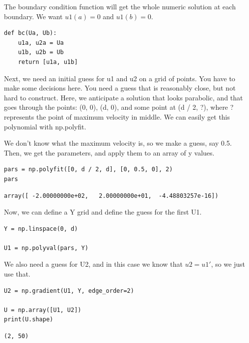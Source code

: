 \documentclass[11pt]{article}
\begin{document}
The boundary condition function will get the whole numeric solution at each boundary. We want \(u1(a) = 0\) and \(u1(b)=0\).

\begin{verbatim}
def bc(Ua, Ub):
    u1a, u2a = Ua
    u1b, u2b = Ub
    return [u1a, u1b]
\end{verbatim}

Next, we need an initial guess for u1 and u2 on a grid of points. You have to make some decisions here. You need a guess that is reasonably close, but not hard to construct. Here, we anticipate a solution that looks parabolic, and that goes through the points: (0, 0), (d, 0), and some point at (d / 2, ?), where ? represents the point of maximum velocity in middle. We can easily get this polynomial with np.polyfit.

We don't know what the maximum velocity is, so we make a guess, say 0.5. Then, we get the parameters, and apply them to an array of y values.

\begin{verbatim}
pars = np.polyfit([0, d / 2, d], [0, 0.5, 0], 2)
pars
\end{verbatim}

\begin{verbatim}
array([ -2.00000000e+02,   2.00000000e+01,  -4.48803257e-16])
\end{verbatim}

Now, we can define a Y grid and define the guess for the first U1.

\begin{verbatim}
Y = np.linspace(0, d)

U1 = np.polyval(pars, Y)
\end{verbatim}

We also need a guess for U2, and in this case we know that \(u2 = u1'\), so we just use that.

\begin{verbatim}
U2 = np.gradient(U1, Y, edge_order=2)

U = np.array([U1, U2])
print(U.shape)
\end{verbatim}

\begin{verbatim}
(2, 50)

\end{verbatim}
\end{document}
